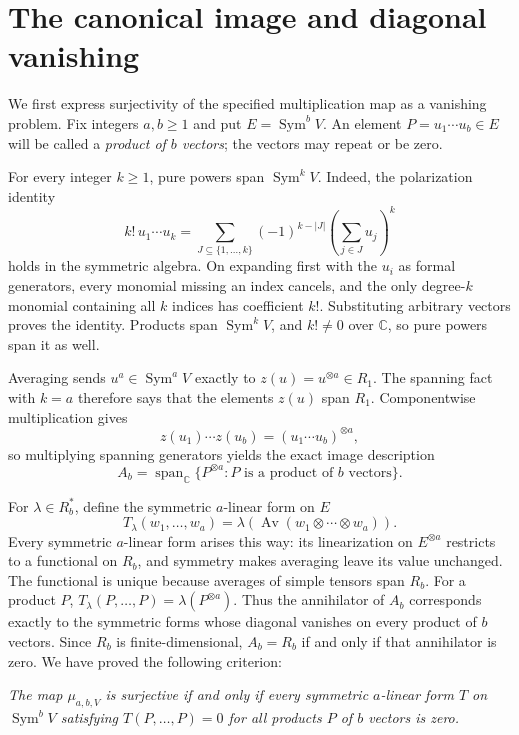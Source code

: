 \documentclass[11pt]{article}
\theoremstyle{remark}
\DeclareMathOperator{\Sym}{Sym}
\DeclareMathOperator{\Av}{Av}
\newcommand{\C}{\mathbb C}
\begin{document}
\section{The canonical image and diagonal vanishing}\label{sec:map}

We first express surjectivity of the specified multiplication map as a
vanishing problem. Fix integers $a,b\ge1$ and put $E=\Sym^b V$. An element
$P=u_1\cdots u_b\in E$ will be called a \emph{product of $b$ vectors};
the vectors may repeat or be zero.

For every integer $k\ge1$, pure powers span $\Sym^k V$. Indeed, the
polarization identity
\[
 k!\,u_1\cdots u_k
 =\sum_{J\subseteq\{1,\ldots,k\}}(-1)^{k-|J|}
   \left(\sum_{j\in J}u_j\right)^k
\]
holds in the symmetric algebra. On expanding first with the $u_i$ as formal
generators, every monomial missing an index cancels, and the only degree-$k$
monomial containing all $k$ indices has coefficient $k!$. Substituting
arbitrary vectors proves the identity. Products span $\Sym^k V$, and
$k!\ne0$ over $\C$, so pure powers span it as well.

Averaging sends $u^a\in\Sym^a V$ exactly to
$z(u)=u^{\otimes a}\in R_1$. The spanning fact with $k=a$ therefore says
that the elements $z(u)$ span $R_1$. Componentwise multiplication gives
\[
 z(u_1)\cdots z(u_b)=(u_1\cdots u_b)^{\otimes a},
\]
so multiplying spanning generators yields the exact image description
\[
 A_b=\operatorname{span}_{\C}
 \{P^{\otimes a}: P\text{ is a product of }b\text{ vectors}\}.
\]

For $\lambda\in R_b^*$, define the symmetric $a$-linear form on $E$
\[
 T_\lambda(w_1,\ldots,w_a)
 =\lambda\!\left(\Av(w_1\otimes\cdots\otimes w_a)\right).
\]
Every symmetric $a$-linear form arises this way: its linearization on
$E^{\otimes a}$ restricts to a functional on $R_b$, and symmetry makes
averaging leave its value unchanged. The functional is unique because
averages of simple tensors span $R_b$. For a product $P$,
$T_\lambda(P,\ldots,P)=\lambda(P^{\otimes a})$. Thus the annihilator of
$A_b$ corresponds exactly to the symmetric forms whose diagonal vanishes
on every product of $b$ vectors. Since $R_b$ is finite-dimensional,
$A_b=R_b$ if and only if that annihilator is zero. We have proved the
following criterion:

\medskip
\noindent
\emph{The map $\mu_{a,b,V}$ is surjective if and only if every symmetric
$a$-linear form $T$ on $\Sym^b V$ satisfying $T(P,\ldots,P)=0$ for all
products $P$ of $b$ vectors is zero.}
\medskip
\end{document}
